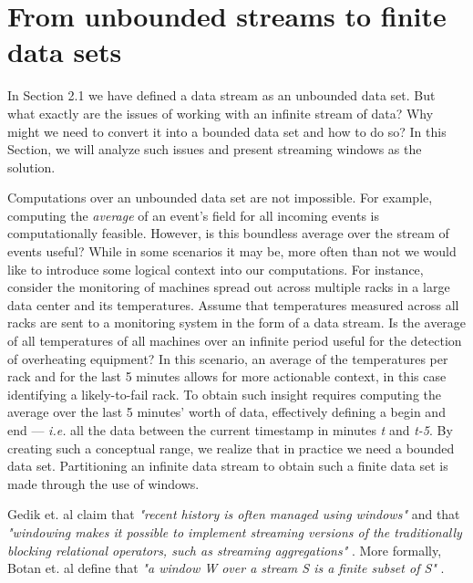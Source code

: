 \section{From unbounded streams to finite data sets} \label{sec:windows}

In Section 2.1 we have defined a data stream as an unbounded data set. But what exactly are the issues of working with an infinite stream of data? Why might we need to convert it into a bounded data set and how to do so? In this Section, we will analyze such issues and present streaming windows as the solution.

Computations over an unbounded data set are not impossible. For example, computing the \textit{average} of an event's field for all incoming events is computationally feasible. However, is this boundless average over the stream of events useful? While in some scenarios it may be, more often than not we would like to introduce some logical context into our computations. For instance, consider the monitoring of machines spread out across multiple racks in a large data center and its temperatures. Assume that temperatures measured across all racks are sent to a monitoring system in the form of a data stream. Is the average of all temperatures of all machines over an infinite period useful for the detection of overheating equipment? In this scenario, an average of the temperatures per rack and for the last 5 minutes allows for more actionable context, in this case identifying a likely-to-fail rack. To obtain such insight requires computing the average over the last 5 minutes' worth of data, effectively defining a begin and end --- \textit{i.e.} all the data between the current timestamp in minutes \textit{t} and \textit{t-5}. By creating such a conceptual range, we realize that in practice we need a bounded data set. Partitioning an infinite data stream to obtain such a finite data set is made through the use of windows.

Gedik et. al claim that \textit{"recent history is often managed using windows"} and that \textit{"windowing makes it possible to implement streaming versions of the traditionally blocking relational operators, such as streaming a\cite{Wang-Windows-Stream-Processing}ggregations"} \cite{Wang-Windows-Stream-Processing}. More formally, Botan et. al define that \textit{"a window W over a stream S is a finite subset of S"} \cite{Botan-SECRET}.

